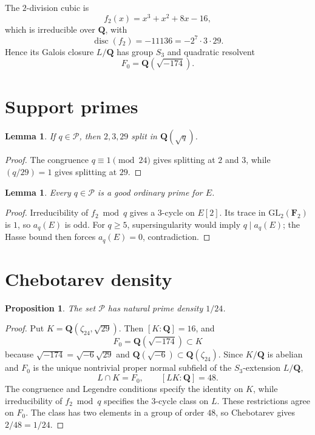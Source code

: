 \documentclass[11pt]{article}
\newtheorem{proposition}[theorem]{Proposition}
\newtheorem{lemma}[theorem]{Lemma}
\newcommand{\Q}{\mathbf Q}
\newcommand{\F}{\mathbf F}
\begin{document}
The \(2\)-division cubic is
\[
f_2(x)=x^3+x^2+8x-16,
\]
which is irreducible over \(\Q\), with
\[
\operatorname{disc}(f_2)=-11136=-2^7\cdot3\cdot29.
\]
Hence its Galois closure \(L/\Q\) has group \(S_3\) and quadratic resolvent
\[
F_0=\Q(\sqrt{-174}).
\]

\section{Support primes}

\begin{lemma}\label{lem:split}
If \(q\in\mathcal P\), then \(2,3,29\) split in \(\Q(\sqrt q)\).
\end{lemma}

\begin{proof}
The congruence \(q\equiv1\pmod{24}\) gives splitting at \(2\) and \(3\),
while \((q/29)=1\) gives splitting at \(29\).
\end{proof}

\begin{lemma}\label{lem:ordinary}
Every \(q\in\mathcal P\) is a good ordinary prime for \(E\).
\end{lemma}

\begin{proof}
Irreducibility of \(f_2\bmod q\) gives a \(3\)-cycle on \(E[2]\).
Its trace in \(\mathrm{GL}_2(\F_2)\) is \(1\), so \(a_q(E)\) is odd.
For \(q\ge5\), supersingularity would imply \(q\mid a_q(E)\); the Hasse
bound then forces \(a_q(E)=0\), contradiction.
\end{proof}

\section{Chebotarev density}

\begin{proposition}\label{prop:density}
The set \(\mathcal P\) has natural prime density \(1/24\).
\end{proposition}

\begin{proof}
Put \(K=\Q(\zeta_{24},\sqrt{29})\). Then \([K:\Q]=16\), and
\[
F_0=\Q(\sqrt{-174})\subset K
\]
because \(\sqrt{-174}=\sqrt{-6}\sqrt{29}\) and
\(\Q(\sqrt{-6})\subset\Q(\zeta_{24})\).
Since \(K/\Q\) is abelian and \(F_0\) is the unique nontrivial proper
normal subfield of the \(S_3\)-extension \(L/\Q\),
\[
L\cap K=F_0,\qquad [LK:\Q]=48.
\]
The congruence and Legendre conditions specify the identity on \(K\), while
irreducibility of \(f_2\bmod q\) specifies the \(3\)-cycle class on \(L\).
These restrictions agree on \(F_0\).  The class has two elements in a group
of order \(48\), so Chebotarev gives \(2/48=1/24\).
\end{proof}
\end{document}

